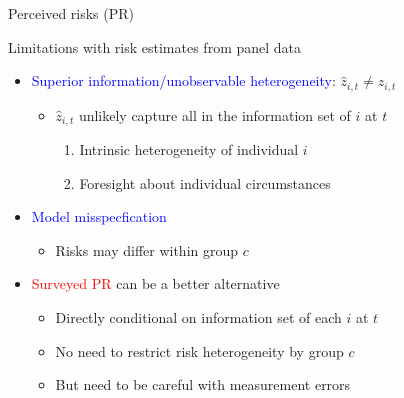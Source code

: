 \documentclass{beamer}
\begin{document}
\begin{frame}{Perceived risks (PR)}
\begin{itemize}
	\end{itemize}	
\end{frame}





\begin{frame}{Limitations with risk estimates from panel data}
	\begin{itemize}
		\item \textcolor{blue}{Superior information/unobservable heterogeneity}: $\hat z_{i,t} \neq z_{i,t}$ 
		\begin{itemize}
			\item $\hat z_{i,t}$ unlikely capture all in the information set of $i$ at $t$
			\begin{enumerate}
				\item Intrinsic heterogeneity of individual $i$ 
				\item Foresight about individual circumstances
			\end{enumerate}
		\end{itemize}
		\pause
		\item \textcolor{blue}{Model misspecfication}
		\begin{itemize}
			\item Risks may differ within group $c$
		\end{itemize}
		\pause
		\item \textcolor{red}{Surveyed PR} can be a better alternative 
		\begin{itemize}
			\item Directly conditional on information set of each $i$ at $t$
			\item No need to restrict risk heterogeneity by group $c$
			\item But need to be careful with measurement errors 
		\end{itemize}
	\end{itemize}	
\end{frame}
\end{document}
